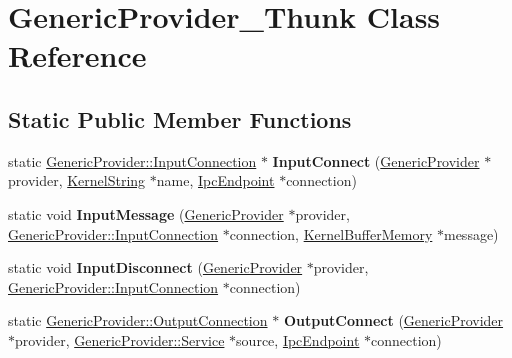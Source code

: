 \hypertarget{class_generic_provider___thunk}{}\section{Generic\+Provider\+\_\+\+Thunk Class Reference}
\label{class_generic_provider___thunk}
\subsection*{Static Public Member Functions}
\begin{DoxyCompactItemize}
\item 
\mbox{\label{class_generic_provider___thunk_a11c30597f6d697796056ed0858d7e880}} 
static \hyperlink{class_generic_provider_1_1_input_connection}{Generic\+Provider\+::\+Input\+Connection} $\ast$ {\bfseries Input\+Connect} (\hyperlink{class_generic_provider}{Generic\+Provider} $\ast$provider, \hyperlink{class_kernel_string}{Kernel\+String} $\ast$name, \hyperlink{class_ipc_endpoint}{Ipc\+Endpoint} $\ast$connection)
\item 
\mbox{\label{class_generic_provider___thunk_ad2286d701abe19d754fdd2e7e04883ca}} 
static void {\bfseries Input\+Message} (\hyperlink{class_generic_provider}{Generic\+Provider} $\ast$provider, \hyperlink{class_generic_provider_1_1_input_connection}{Generic\+Provider\+::\+Input\+Connection} $\ast$connection, \hyperlink{class_kernel_buffer_memory}{Kernel\+Buffer\+Memory} $\ast$message)
\item 
\mbox{\label{class_generic_provider___thunk_a96aecd845f4b7c91630d9a307a045021}} 
static void {\bfseries Input\+Disconnect} (\hyperlink{class_generic_provider}{Generic\+Provider} $\ast$provider, \hyperlink{class_generic_provider_1_1_input_connection}{Generic\+Provider\+::\+Input\+Connection} $\ast$connection)
\item 
\mbox{\label{class_generic_provider___thunk_aabbcdf1e3c9a0007281c51ddca7306fc}} 
static \hyperlink{class_generic_provider_1_1_output_connection}{Generic\+Provider\+::\+Output\+Connection} $\ast$ {\bfseries Output\+Connect} (\hyperlink{class_generic_provider}{Generic\+Provider} $\ast$provider, \hyperlink{class_generic_provider_1_1_service}{Generic\+Provider\+::\+Service} $\ast$source, \hyperlink{class_ipc_endpoint}{Ipc\+Endpoint} $\ast$connection)

\end{DoxyCompactItemize}
